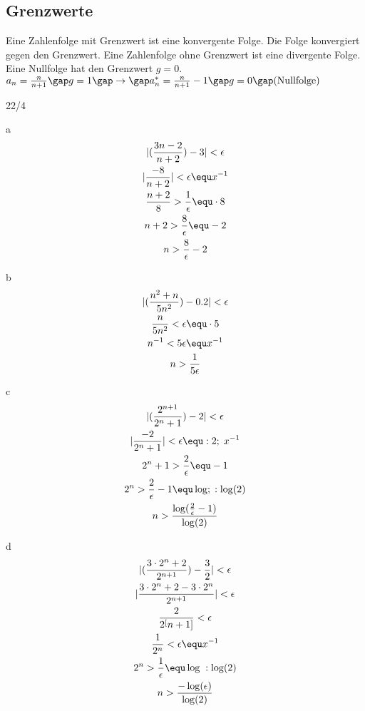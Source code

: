 \subsection{Grenzwerte}
Eine Zahlenfolge mit Grenzwert ist eine konvergente Folge. Die Folge konvergiert gegen den Grenzwert. Eine Zahlenfolge ohne Grenzwert ist eine divergente Folge. Eine Nullfolge hat den Grenzwert $g = 0$. \\
$a_n = \frac{n}{n+1}\gap g = 1\gap \rightarrow\gap a_n^\ast = \frac{n}{n+1} - 1\gap g = 0\gap \text{(Nullfolge)}$
\begin{exercise}{22/4}
  \item [a]
  \begin{gather*}
    |(\frac{3n-2}{n+2}) - 3| < \epsilon \\
    |\frac{-8}{n+2}| < \epsilon \equ x^{-1} \\
    \frac{n+2}{8} > \frac{1}{\epsilon} \equ \cdot 8 \\
    n + 2 > \frac{8}{\epsilon} \equ -2 \\
    n > \frac{8}{\epsilon} - 2
  \end{gather*}
  \item [b]
  \begin{gather*}
    |(\frac{n^2+n}{5n^2}) - 0.2| < \epsilon \\
    \frac{n}{5n^2} < \epsilon \equ \cdot 5 \\
    n^{-1} < 5 \epsilon \equ x^{-1} \\
    n > \frac{1}{5 \epsilon}
  \end{gather*}
  \item [c]
  \begin{gather*}
    |(\frac{2^{n + 1}}{2^n + 1}) - 2| < \epsilon \\
    |\frac{-2}{2^n + 1}| < \epsilon \equ :2;\; x^{-1} \\
    2^n + 1 > \frac{2}{\epsilon} \equ -1 \\
    2^n > \frac{2}{\epsilon} - 1 \equ \log;\; :\log(2) \\
    n > \frac{\log(\frac{2}{\epsilon} - 1)}{\log(2)}
  \end{gather*}
  \item [d]
  \begin{gather*}
    |(\frac{3 \cdot 2^n + 2}{2^{n+1}}) - \frac{3}{2}| < \epsilon \\
    |\frac{3 \cdot 2^n + 2 - 3 \cdot 2^n}{2^{n+1}}| < \epsilon \\
    \frac{2}{2^[n+1]} < \epsilon \\
    \frac{1}{2^n} < \epsilon \equ x^{-1} \\
    2^n > \frac{1}{\epsilon} \equ \log\; :\log(2) \\
    n > \frac{-\log(\epsilon)}{\log(2)}
  \end{gather*}
\end{exercise}
